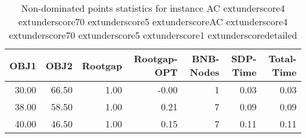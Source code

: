 \begin{table}
\caption{Non-dominated points statistics for instance AC	extunderscore4	extunderscore70	extunderscore5	extunderscoreAC	extunderscore4	extunderscore70	extunderscore5	extunderscore1	extunderscoredetailed}
\label{tab:stats/AC_4_70_5_AC_4_70_5_1_detailed}
\begin{tabular}{rrrrrrr}
\toprule
OBJ1 & OBJ2 & Rootgap & Rootgap-OPT & BNB-Nodes & SDP-Time & Total-Time \\
\midrule
30.00 & 66.50 & 1.00 & -0.00 & 1 & 0.03 & 0.03 \\
38.00 & 58.50 & 1.00 & 0.21 & 7 & 0.09 & 0.09 \\
40.00 & 46.50 & 1.00 & 0.15 & 7 & 0.11 & 0.11 \\
\bottomrule
\end{tabular}
\end{table}
